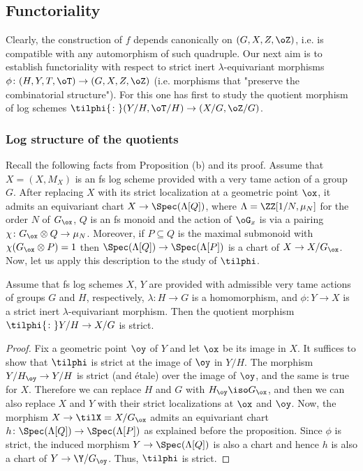 \documentclass[10pt]{../fichiers-configuration-latex/smfart}
\begin{document}
\subsection{Functoriality}\label{8-functsec} Clearly, the
construction of $f$ depends canonically on $(G,X,Z,\oZ)$,
i.e. is compatible with any automorphism of such
quadruple. Our next aim is to establish functoriality with
respect to strict inert $\lambda$-equivariant morphisms
$\phi{\colon}(H,Y,T,\oT)\to(G,X,Z,\oZ)$ (i.e. morphisms
that "preserve the combinatorial structure"). For this one
has first to study the quotient morphism of log schemes
$\tilphi{\colon}(Y/H,\oT/H)\to(X/G,\oZ/G)$.

\subsubsection{Log structure of the quotients}\label{8-logquotsec}
Recall the following facts from Proposition (b)
and its proof. Assume that $X=(X,M_X)$ is an fs log scheme provided with a
very tame action of a group $G$. After replacing $X$ with its strict
localization at a geometric point $\ox$, it admits an equivariant
chart $X\to\Spec(\Lambda[Q])$, where $\Lambda=\ZZ[1/N,\mu_N]$
for the order $N$ of $G_\ox$, $Q$ is an fs monoid and the
action of $\oG_x$ is via a pairing $\chi{\colon}G_\ox\otimes
Q\to\mu_N$. Moreover, if $P\subseteq Q$ is the maximal submonoid with
$\chi(G_\ox\otimes P)=1$ then $\Spec(\Lambda[Q])\to\Spec(\Lambda[P])$
is a chart of $X\to X/G_\ox$. Now, let us apply this description
to the study of $\tilphi$.

\begin{proposition2}\label{8-logquotprop} Assume that fs log schemes
$X$, $Y$ are provided with admissible very tame actions of groups $G$
and $H$, respectively,  $\lambda{\colon}H\to G$ is a homomorphism,
and $\phi{\colon}Y\to X$ is a strict inert $\lambda$-equivariant
morphism. Then the quotient morphism $\tilphi{\colon}Y/H\to X/G$
is strict.  \end{proposition2} \begin{proof} Fix a geometric point
$\oy$ of $Y$ and let $\ox$ be its image in $X$. It suffices to
show that $\tilphi$ is strict at the image of $\oy$ in $Y/H$. The
morphism $Y/H_\oy\to Y/H$ is strict (and \'etale) over the image of
$\oy$, and the same is true for $X$. Therefore we can replace $H$
and $G$ with $H_\oy\iso G_\ox$, and then we can also replace $X$
and $Y$ with their strict localizations at $\ox$ and $\oy$. Now,
the morphism $X\to\tilX=X/G_\ox$ admits an equivariant chart
$h{\colon}\Spec(\Lambda[Q])\to\Spec(\Lambda[P])$ as explained before
the proposition. Since $\phi$ is strict, the induced morphism
$Y\to\Spec(\Lambda[Q])$ is also a chart and hence $h$ is also a
chart of $Y\to\Y/G_\oy$. Thus, $\tilphi$ is strict.  \end{proof}
\end{document}
